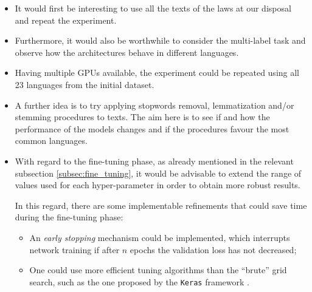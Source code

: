 \documentclass[letterpaper,11pt]{article}
\begin{document}
\begin{itemize}
  \item It would first be interesting to use all the texts of the laws at our disposal and repeat the experiment.
  \item Furthermore, it would also be worthwhile to consider the multi-label task and observe how the architectures behave in different languages.
  \item Having multiple GPUs available, the experiment could be repeated using all 23 languages from the initial dataset.
  \item A further idea is to try applying stopwords removal, lemmatization and/or stemming procedures to texts. The aim here is to see if and how the performance of the models changes and if the procedures favour the most common languages.
  \item With regard to the fine-tuning phase, as already mentioned in the relevant subsection \ref{subsec:fine_tuning}, it would be advisable to extend the range of values used for each hyper-parameter in order to obtain more robust results. 
  
  In this regard, there are some implementable refinements that could save time during the fine-tuning phase:
  \begin{itemize}
    \item An \textit{early stopping} mechanism could be implemented, which interrupts network training if after $n$ epochs the validation loss has not decreased;
    \item One could use more efficient tuning algorithms than the ``brute'' grid search, such as the one proposed by the \verb|Keras| framework \cite{omalley2019kerastuner}. 
  \end{itemize}
\end{itemize}

\end{document}
